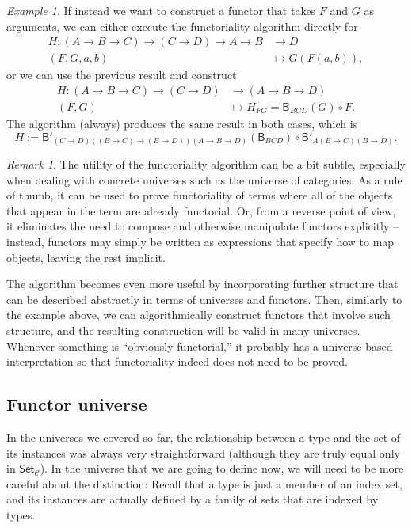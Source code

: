 \documentclass[a4paper]{article}
\theoremstyle{definition}
\theoremstyle{remark}
\newtheorem*{remark}{Remark}
\newtheorem*{example}{Example}
\newcommand{\C}{\mathcal{C}}
\newcommand{\nm}{\mathsf}
\newcommand{\universe}{\nm}
\newcommand{\Set}{\universe{Set}}
\newcommand{\combinator}{\nm}
\newcommand{\compFun}{\combinator{B'}}
\newcommand{\revCompFun}{\combinator{B}}
\begin{document}
\begin{example}
  If instead we want to construct a functor that takes $F$ and $G$ as
  arguments, we can either execute the functoriality algorithm directly for
  \begin{align*}
    H : (A \to B \to C) \to (C \to D) \to A \to B &\to     D\\
        (F,G,a,b)                                 &\mapsto G(F(a,b)),
  \end{align*}
  or we can use the previous result and construct
  \begin{align*}
    H : (A \to B \to C) \to (C \to D) &\to     (A \to B \to D)\\
        (F,G)                         &\mapsto H_{FG} = \revCompFun_{BCD}(G) \circ F.
  \end{align*}
  The algorithm (always) produces the same result in both cases, which is
  \[H := \compFun_{(C{\to}D)((B{\to}C){\to}(B{\to}D))(A{\to}B{\to}D)}(\revCompFun_{BCD}) \circ \compFun_{A(B{\to}C)(B{\to}D)}.\]
\end{example}

\begin{remark}
  The utility of the functoriality algorithm can be a bit subtle, especially when dealing
  with concrete universes such as the universe of categories. As a rule of thumb, it can
  be used to prove functoriality of terms where all of the objects that appear in the term
  are already functorial. Or, from a reverse point of view, it eliminates the need to
  compose and otherwise manipulate functors explicitly -- instead, functors may simply be
  written as expressions that specify how to map objects, leaving the rest implicit.

  The algorithm becomes even more useful by incorporating further structure that can be
  described abstractly in terms of universes and functors. Then, similarly to the example
  above, we can algorithmically construct functors that involve such structure, and the
  resulting construction will be valid in many universes. Whenever something is
  ``obviously functorial,'' it probably has a universe-based interpretation so that
  functoriality indeed does not need to be proved.
\end{remark}

\subsection{Functor universe}
\label{sec:functor-universe}

In the universes we covered so far, the relationship between a type and the set of its
instances was always very straightforward (although they are truly equal only in $\Set_\C$).
In the universe that we are going to define now, we will need to be more careful about the
distinction: Recall that a type is just a member of an index set, and its instances are
actually defined by a family of sets that are indexed by types.
\end{document}
